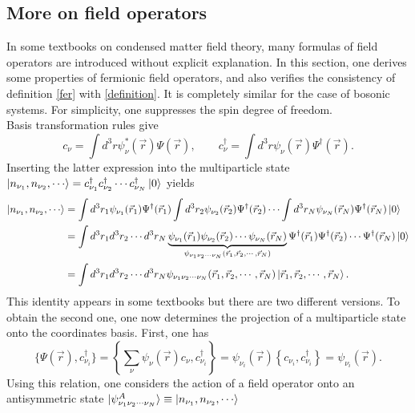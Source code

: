 \documentclass[a4paper,12pts]{article}
\numberwithin{equation}{section}
\begin{document}
	\subsection{More on field operators}
	In some textbooks on condensed matter field theory, many formulas of field operators are introduced without explicit explanation. In this section, one derives some properties of fermionic field operators, and also verifies the consistency of definition \ref{fer} with \ref{definition}. It is completely similar for the case of bosonic systems. For simplicity, one suppresses the spin degree of freedom.\\
	Basis transformation rules give
	\begin{equation}
	c_{\nu} = \int d^3r\psi_{\nu}^*(\vec{r})\Psi(\vec{r}),\qquad c^{\dagger}_{\nu} = \int d^3r\psi_{\nu}(\vec{r})\Psi^{\dagger}(\vec{r}).
	\end{equation}
	Inserting the latter expression into the multiparticle state $\ket{n_{\nu_1},n_{\nu_2},\cdots} = c^{\dagger}_{\nu_1}c^{\dagger}_{\nu_2}\cdots c^{\dagger}_{\nu_N}\ket{0}$ yields
	\begin{align}
	\ket{n_{\nu_1},n_{\nu_2},\cdots} &= \int d^3r_1\psi_{\nu_1}(\vec{r}_1)\Psi^{\dagger}(\vec{r}_1)\int d^3r_2\psi_{\nu_2}(\vec{r}_2)\Psi^{\dagger}(\vec{r}_2)\cdots\int d^3r_N\psi_{\nu_N}(\vec{r}_N)\Psi^{\dagger}(\vec{r}_N)\ket{0}\\
	&= \int d^3r_1d^3r_2\cdots d^3r_N\underbrace{\psi_{\nu_1}(\vec{r}_1)\psi_{\nu_2}(\vec{r}_2)\cdots\psi_{\nu_N}(\vec{r}_N)}_{\psi_{\nu_1\nu_2\cdots\nu_N}(\vec{r}_1,\vec{r}_2,\cdots,\vec{r}_N)}\Psi^{\dagger}(\vec{r}_1)\Psi^{\dagger}(\vec{r}_2)\cdots\Psi^{\dagger}(\vec{r}_N)\ket{0}\\
	&= \int d^3r_1d^3r_2\cdots d^3r_N\psi_{\nu_1\nu_2\cdots\nu_N}(\vec{r}_1,\vec{r}_2,\cdots,\vec{r}_N)\ket{\vec{r}_1,\vec{r}_2,\cdots,\vec{r}_N}.\label{compare}
	\end{align}
	This identity appears in some textbooks but there are two different versions. To obtain the second one, one now determines the projection of a multiparticle state onto the coordinates basis. First, one has
	\begin{equation}
	\{\Psi(\vec{r}),c^{\dagger}_{\nu_i}\} = \left\lbrace\sum_{\nu}\psi_{\nu}(\vec{r})c_{\nu},c^{\dagger}_{\nu_i}\right\rbrace = \psi_{\nu_i}(\vec{r})\left\lbrace c_{\nu_i},c^{\dagger}_{\nu_i}\right\rbrace = \psi_{\nu_i}(\vec{r}).
	\end{equation}
	Using this relation, one considers the action of a field operator onto an antisymmetric state $\ket{\psi^A_{\nu_1\nu_2\cdots\nu_N}}\equiv\ket{n_{\nu_1},n_{\nu_2},\cdots}$
\end{document}
